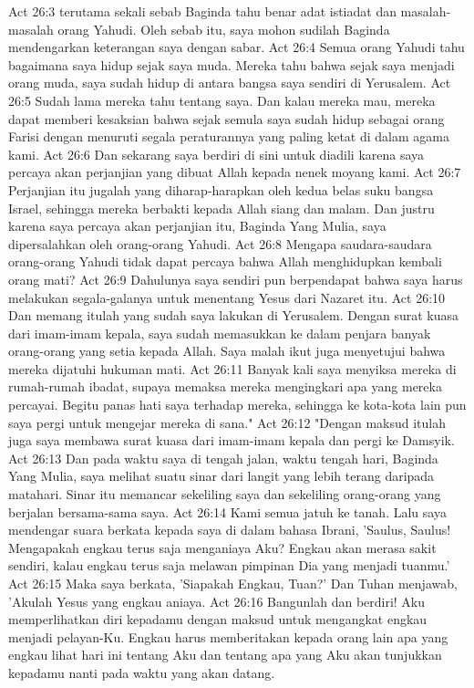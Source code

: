 Act 26:3  terutama sekali sebab Baginda tahu benar adat istiadat dan masalah-masalah orang Yahudi. Oleh sebab itu, saya mohon sudilah Baginda mendengarkan keterangan saya dengan sabar.
Act 26:4  Semua orang Yahudi tahu bagaimana saya hidup sejak saya muda. Mereka tahu bahwa sejak saya menjadi orang muda, saya sudah hidup di antara bangsa saya sendiri di Yerusalem.
Act 26:5  Sudah lama mereka tahu tentang saya. Dan kalau mereka mau, mereka dapat memberi kesaksian bahwa sejak semula saya sudah hidup sebagai orang Farisi dengan menuruti segala peraturannya yang paling ketat di dalam agama kami.
Act 26:6  Dan sekarang saya berdiri di sini untuk diadili karena saya percaya akan perjanjian yang dibuat Allah kepada nenek moyang kami.
Act 26:7  Perjanjian itu jugalah yang diharap-harapkan oleh kedua belas suku bangsa Israel, sehingga mereka berbakti kepada Allah siang dan malam. Dan justru karena saya percaya akan perjanjian itu, Baginda Yang Mulia, saya dipersalahkan oleh orang-orang Yahudi.
Act 26:8  Mengapa saudara-saudara orang-orang Yahudi tidak dapat percaya bahwa Allah menghidupkan kembali orang mati?
Act 26:9  Dahulunya saya sendiri pun berpendapat bahwa saya harus melakukan segala-galanya untuk menentang Yesus dari Nazaret itu.
Act 26:10  Dan memang itulah yang sudah saya lakukan di Yerusalem. Dengan surat kuasa dari imam-imam kepala, saya sudah memasukkan ke dalam penjara banyak orang-orang yang setia kepada Allah. Saya malah ikut juga menyetujui bahwa mereka dijatuhi hukuman mati.
Act 26:11  Banyak kali saya menyiksa mereka di rumah-rumah ibadat, supaya memaksa mereka mengingkari apa yang mereka percayai. Begitu panas hati saya terhadap mereka, sehingga ke kota-kota lain pun saya pergi untuk mengejar mereka di sana."
Act 26:12  "Dengan maksud itulah juga saya membawa surat kuasa dari imam-imam kepala dan pergi ke Damsyik.
Act 26:13  Dan pada waktu saya di tengah jalan, waktu tengah hari, Baginda Yang Mulia, saya melihat suatu sinar dari langit yang lebih terang daripada matahari. Sinar itu memancar sekeliling saya dan sekeliling orang-orang yang berjalan bersama-sama saya.
Act 26:14  Kami semua jatuh ke tanah. Lalu saya mendengar suara berkata kepada saya di dalam bahasa Ibrani, 'Saulus, Saulus! Mengapakah engkau terus saja menganiaya Aku? Engkau akan merasa sakit sendiri, kalau engkau terus saja melawan pimpinan Dia yang menjadi tuanmu.'
Act 26:15  Maka saya berkata, 'Siapakah Engkau, Tuan?' Dan Tuhan menjawab, 'Akulah Yesus yang engkau aniaya.
Act 26:16  Bangunlah dan berdiri! Aku memperlihatkan diri kepadamu dengan maksud untuk mengangkat engkau menjadi pelayan-Ku. Engkau harus memberitakan kepada orang lain apa yang engkau lihat hari ini tentang Aku dan tentang apa yang Aku akan tunjukkan kepadamu nanti pada waktu yang akan datang.
